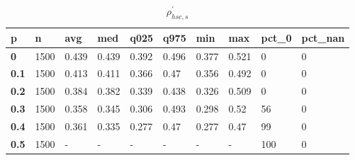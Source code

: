 \begin{table}[h]
 \centering 
\footnotesize
\caption{$\rho_{hsc,s}^\prime $}
\label{tab:alphahscs}
\begin{tabular}[h]{|l|l|l|l|l|l|l|l|l|l|
    } \hline
\textbf{ p} & \textbf{ n} & \textbf{ avg} & \textbf{ med} & \textbf{ q025} & \textbf{ q975} & \textbf{ min} & \textbf{ max} & \textbf{ pct\_0} & \textbf{ pct\_nan}
    \\ \hline
  \textbf{  0} & 1500 & 0.439 & 0.439 & 0.392 & 0.496 & 0.377 & 0.521 &   0 & 0
    \\ \hline
  \textbf{0.1} & 1500 & 0.413 & 0.411 & 0.366 &  0.47 & 0.356 & 0.492 &   0 & 0
    \\ \hline
  \textbf{0.2} & 1500 & 0.384 & 0.382 & 0.339 & 0.438 & 0.326 & 0.509 &   0 & 0
    \\ \hline
  \textbf{0.3} & 1500 & 0.358 & 0.345 & 0.306 & 0.493 & 0.298 &  0.52 &  56 & 0
    \\ \hline
  \textbf{0.4} & 1500 & 0.361 & 0.335 & 0.277 &  0.47 & 0.277 &  0.47 &  99 & 0
    \\ \hline
  \textbf{0.5} & 1500 & - & - & - & - & - & - & 100 & 0
    \\ \hline
 \end{tabular}
 \end{table}
